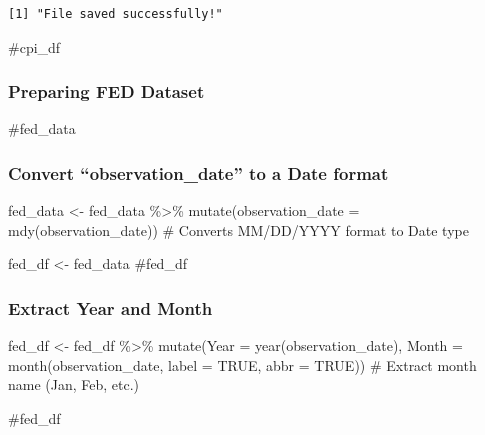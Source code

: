 \documentclass[
  letterpaper,
  DIV=11,
  numbers=noendperiod]{scrartcl}
\newenvironment{Shaded}{\begin{snugshade}}{\end{snugshade}}
\newcommand{\AttributeTok}[1]{\textcolor[rgb]{0.40,0.45,0.13}{#1}}
\newcommand{\CommentTok}[1]{\textcolor[rgb]{0.37,0.37,0.37}{#1}}
\newcommand{\ConstantTok}[1]{\textcolor[rgb]{0.56,0.35,0.01}{#1}}
\newcommand{\FunctionTok}[1]{\textcolor[rgb]{0.28,0.35,0.67}{#1}}
\newcommand{\NormalTok}[1]{\textcolor[rgb]{0.00,0.23,0.31}{#1}}
\newcommand{\OtherTok}[1]{\textcolor[rgb]{0.00,0.23,0.31}{#1}}
\newcommand{\SpecialCharTok}[1]{\textcolor[rgb]{0.37,0.37,0.37}{#1}}
\begin{document}
\begin{verbatim}
[1] "File saved successfully!"
\end{verbatim}

\begin{Shaded}
\begin{Highlighting}[]
\CommentTok{\#cpi\_df}
\end{Highlighting}
\end{Shaded}

\subsubsection{Preparing FED Dataset}\label{preparing-fed-dataset}

\begin{Shaded}
\begin{Highlighting}[]
\CommentTok{\#fed\_data}
\end{Highlighting}
\end{Shaded}

\subsubsection{Convert ``observation\_date'' to a Date
format}\label{convert-observation_date-to-a-date-format}

\begin{Shaded}
\begin{Highlighting}[]
\NormalTok{fed\_data }\OtherTok{\textless{}{-}}\NormalTok{ fed\_data }\SpecialCharTok{\%\textgreater{}\%}
  \FunctionTok{mutate}\NormalTok{(}\AttributeTok{observation\_date =} \FunctionTok{mdy}\NormalTok{(observation\_date))  }\CommentTok{\# Converts MM/DD/YYYY format to Date type}

\NormalTok{fed\_df }\OtherTok{\textless{}{-}}\NormalTok{ fed\_data}
\CommentTok{\#fed\_df}
\end{Highlighting}
\end{Shaded}

\subsubsection{Extract Year and Month}\label{extract-year-and-month}

\begin{Shaded}
\begin{Highlighting}[]
\NormalTok{fed\_df }\OtherTok{\textless{}{-}}\NormalTok{ fed\_df }\SpecialCharTok{\%\textgreater{}\%}
  \FunctionTok{mutate}\NormalTok{(}\AttributeTok{Year =} \FunctionTok{year}\NormalTok{(observation\_date),}
         \AttributeTok{Month =} \FunctionTok{month}\NormalTok{(observation\_date, }\AttributeTok{label =} \ConstantTok{TRUE}\NormalTok{, }\AttributeTok{abbr =} \ConstantTok{TRUE}\NormalTok{))  }\CommentTok{\# Extract month name (Jan, Feb, etc.)}

\CommentTok{\#fed\_df}
\end{Highlighting}
\end{Shaded}
\end{document}
